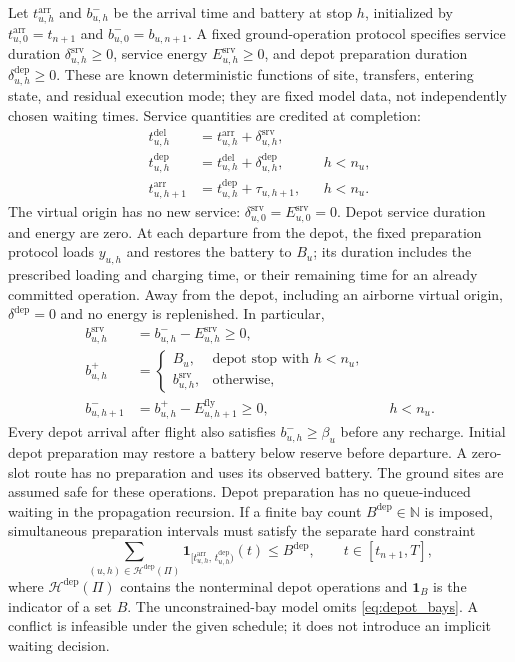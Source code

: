 Let $t_{u,h}^{\mathrm{arr}}$ and $b_{u,h}^{-}$ be the arrival time and
battery at stop $h$, initialized by
$t_{u,0}^{\mathrm{arr}}=t_{n+1}$ and $b_{u,0}^{-}=b_{u,n+1}$.
A fixed ground-operation protocol specifies service duration
$\delta_{u,h}^{\mathrm{srv}}\ge0$, service energy
$E_{u,h}^{\mathrm{srv}}\ge0$, and depot preparation duration
$\delta_{u,h}^{\mathrm{dep}}\ge0$. These are known deterministic functions
of site, transfers, entering state, and residual execution mode; they
are fixed model data, not independently chosen waiting times.
Service quantities are credited at completion:
\begin{align}
t_{u,h}^{\mathrm{del}}
&=t_{u,h}^{\mathrm{arr}}+\delta_{u,h}^{\mathrm{srv}},
\label{eq:delivery_time}\\
t_{u,h}^{\mathrm{dep}}
&=t_{u,h}^{\mathrm{del}}+\delta_{u,h}^{\mathrm{dep}},
&&h<n_u,
\label{eq:departure_time}\\
t_{u,h+1}^{\mathrm{arr}}
&=t_{u,h}^{\mathrm{dep}}+\tau_{u,h+1},
&&h<n_u.
\label{eq:time_recursion}
\end{align}
The virtual origin has no new service:
$\delta_{u,0}^{\mathrm{srv}}=E_{u,0}^{\mathrm{srv}}=0$.
Depot service duration and energy are zero. At each departure from the depot, the fixed
preparation protocol loads $y_{u,h}$ and restores the battery to $B_u$;
its duration includes the prescribed loading and charging time, or their
remaining time for an already committed operation. Away from the depot,
including an airborne virtual origin, $\delta^{\mathrm{dep}}=0$ and no
energy is replenished. In particular,
\begin{align}
b_{u,h}^{\mathrm{srv}}&=b_{u,h}^{-}-E_{u,h}^{\mathrm{srv}}\ge0,
\label{eq:service_battery}\\
b_{u,h}^{+}
&=\begin{cases}
B_u,&\text{depot stop with }h<n_u,\\
b_{u,h}^{\mathrm{srv}},&\text{otherwise},
\end{cases}
\label{eq:depot_recharge}\\
b_{u,h+1}^{-}&=b_{u,h}^{+}-E_{u,h+1}^{\mathrm{fly}}\ge0,
&&h<n_u.
\label{eq:battery_recursion}
\end{align}
Every depot arrival after flight also satisfies
$b_{u,h}^{-}\ge\beta_u$ before any recharge. Initial depot preparation may
restore a battery below reserve before departure. A zero-slot route has no
preparation and uses its observed battery.
The ground sites are assumed safe for these operations. Depot preparation
has no queue-induced waiting in the propagation recursion. If a finite bay
count $B^{\mathrm{dep}}\in\mathbb N$ is imposed, simultaneous preparation
intervals must satisfy the separate hard constraint
\begin{equation}
\sum_{(u,h)\in\mathcal H^{\mathrm{dep}}(\Pi)}
\mathbf 1_{[t_{u,h}^{\mathrm{arr}},\,t_{u,h}^{\mathrm{dep}})}(t)
\le B^{\mathrm{dep}},\qquad t\in[t_{n+1},T],
\label{eq:depot_bays}
\end{equation}
where $\mathcal H^{\mathrm{dep}}(\Pi)$ contains the nonterminal depot
operations and $\mathbf 1_B$ is the indicator of a set $B$.
The unconstrained-bay model omits \eqref{eq:depot_bays}. A conflict is
infeasible under the given schedule; it does not introduce an implicit
waiting decision.

